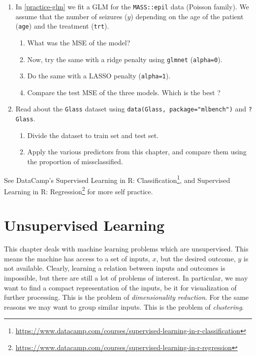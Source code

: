 \documentclass[]{book}
\providecommand{\tightlist}{%
  \setlength{\itemsep}{0pt}\setlength{\parskip}{0pt}}
\renewcommand{\href}[2]{#2\footnote{\url{#1}}}
\theoremstyle{definition}
\theoremstyle{definition}
\theoremstyle{definition}
\theoremstyle{remark}
\begin{document}
\begin{enumerate}
\def\labelenumi{\arabic{enumi}.}
\tightlist
\item
  In \ref{practice-glm} we fit a GLM for the \texttt{MASS::epil} data (Poisson family). We assume that the number of seizures (\(y\)) depending on the age of the patient (\texttt{age}) and the treatment (\texttt{trt}).

  \begin{enumerate}
  \def\labelenumii{\arabic{enumii}.}
  \tightlist
  \item
    What was the MSE of the model?
  \item
    Now, try the same with a ridge penalty using \texttt{glmnet} (\texttt{alpha=0}).
  \item
    Do the same with a LASSO penalty (\texttt{alpha=1}).
  \item
    Compare the test MSE of the three models. Which is the best ?
  \end{enumerate}
\item
  Read about the \texttt{Glass} dataset using \texttt{data(Glass,\ package="mlbench")} and \texttt{?Glass}.

  \begin{enumerate}
  \def\labelenumii{\arabic{enumii}.}
  \tightlist
  \item
    Divide the dataset to train set and test set.
  \item
    Apply the various predictors from this chapter, and compare them using the proportion of missclassified.
  \end{enumerate}
\end{enumerate}

See DataCamp's \href{https://www.datacamp.com/courses/supervised-learning-in-r-classification}{Supervised Learning in R: Classification}, and \href{https://www.datacamp.com/courses/supervised-learning-in-r-regression}{Supervised Learning in R: Regression} for more self practice.

\hypertarget{unsupervised}{%
\chapter{Unsupervised Learning}\label{unsupervised}}

This chapter deals with machine learning problems which are unsupervised.
This means the machine has access to a set of inputs, \(x\), but the desired outcome, \(y\) is not available.
Clearly, learning a relation between inputs and outcomes is impossible, but there are still a lot of problems of interest.
In particular, we may want to find a compact representation of the inputs, be it for visualization of further processing.
This is the problem of \emph{dimensionality reduction}.
For the same reasons we may want to group similar inputs. This is the problem of \emph{clustering}.
\end{document}
